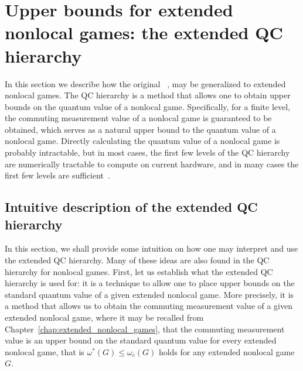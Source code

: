 \minitoc

\section{Upper bounds for extended nonlocal games: the extended QC hierarchy}
\label{sec:extended-npa-hierarchy}

In this section we describe how the original ~\cite{Doherty2008,Navascues2007, Navascues2008}, may be generalized to extended nonlocal games. The QC hierarchy is a method that allows one to obtain upper bounds on the quantum value of a nonlocal game. Specifically, for a finite level, the commuting measurement value of a nonlocal game is guaranteed to be obtained, which serves as a natural upper bound to the quantum value of a nonlocal game. Directly calculating the quantum value of a nonlocal game is probably intractable, but in most cases, the first few levels of the QC hierarchy are numerically tractable to compute on current hardware, and in many cases the first few levels are sufficient~\cite{Pal2009}. 

\subsection{Intuitive description of the extended QC hierarchy} \label{sec:intuitive-description-of-the-extended-qc-hierarchy}

In this section, we shall provide some intuition on how one may interpret and use the extended QC hierarchy. Many of these ideas are also found in the QC hierarchy for nonlocal games. First, let us establish what the extended QC hierarchy is used for: it is a technique to allow one to place upper bounds on the standard quantum value of a given extended nonlocal game. More precisely, it is a method that allows us to obtain the commuting measurement value of a given extended nonlocal game, where it may be recalled from Chapter~\ref{chap:extended_nonlocal_games}, that the commuting measurement value is an upper bound on the standard quantum value for every extended nonlocal game, that is $\omega^*(G) \leq \omega_c(G)$ holds for any extended nonlocal game $G$. 

